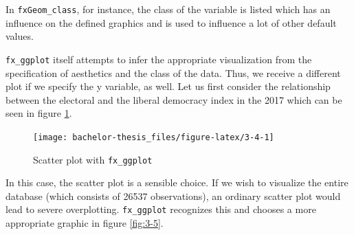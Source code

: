 \documentclass[]{report}
\newenvironment{Shaded}{\begin{snugshade}}{\end{snugshade}}
\newcommand{\KeywordTok}[1]{\textcolor[rgb]{0.13,0.29,0.53}{\textbf{#1}}}
\newcommand{\DataTypeTok}[1]{\textcolor[rgb]{0.13,0.29,0.53}{#1}}
\newcommand{\DecValTok}[1]{\textcolor[rgb]{0.00,0.00,0.81}{#1}}
\newcommand{\StringTok}[1]{\textcolor[rgb]{0.31,0.60,0.02}{#1}}
\newcommand{\OperatorTok}[1]{\textcolor[rgb]{0.81,0.36,0.00}{\textbf{#1}}}
\newcommand{\NormalTok}[1]{#1}
\theoremstyle{definition}
\theoremstyle{definition}
\theoremstyle{definition}
\theoremstyle{remark}
\begin{document}
In \texttt{fxGeom\_class}, for instance, the class of the variable is
listed which has an influence on the defined graphics and is used to
influence a lot of other default values.

\texttt{fx\_ggplot} itself attempts to infer the appropriate
visualization from the specification of aesthetics and the class of the
data. Thus, we receive a different plot if we specify the y variable, as
well. Let us first consider the relationship between the electoral and
the liberal democracy index in the 2017 which can be seen in figure
\ref{fig:3-4}.

\begin{Shaded}
\end{Shaded}

\begin{figure}

{\centering \texttt{[image: bachelor-thesis\_files/figure-latex/3-4-1]} 

}

\caption{Scatter plot with \texttt{fx\_ggplot}}\label{fig:3-4}
\end{figure}



In this case, the scatter plot is a sensible choice. If we wish to
visualize the entire database (which consists of 26537 observations), an
ordinary scatter plot would lead to severe overplotting.
\texttt{fx\_ggplot} recognizes this and chooses a more appropriate
graphic in figure \ref{fig:3-5}.

\begin{Shaded}
\end{Shaded}
\end{document}
